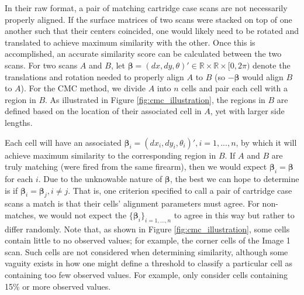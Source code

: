 In their raw format, a pair of matching cartridge case scans are not
necessarily properly aligned. If the surface matrices of two scans were
stacked on top of one another such that their centers coincided, one
would likely need to be rotated and translated to achieve maximum
similarity with the other. Once this is accomplished, an accurate
similarity score can be calculated between the two scans. For two scans
\(A\) and \(B\), let
\(\pmb{\beta} = (dx, dy, \theta)' \in \mathbb{R} \times \mathbb{R} \times [0,2\pi)\)
denote the translations and rotation needed to properly align \(A\) to
\(B\) (so \(-\pmb{\beta}\) would align \(B\) to \(A\)). For the CMC
method, we divide \(A\) into \(n\) cells and pair each cell with a
region in \(B\). As illustrated in Figure \ref{fig:cmc_illustration},
the regions in \(B\) are defined based on the location of their
associated cell in \(A\), yet with larger side lengths.

Each cell will have an associated
\(\pmb{\beta}_i = (dx_i, dy_i, \theta_i)', i = 1,...,n\), by which it
will achieve maximum similarity to the corresponding region in \(B\). If
\(A\) and \(B\) are truly matching (were fired from the same firearm),
then we would expect \(\pmb{\beta}_i = \pmb{\beta}\) for each \(i\). Due
to the unknowable nature of \(\pmb{\beta}\), the best we can hope to
determine is if \(\pmb{\beta}_i = \pmb{\beta}_j, i \neq j\). That is,
one criterion specified to call a pair of cartridge case scans a match
is that their cells' alignment parameters must agree. For non-matches,
we would not expect the \(\{\pmb{\beta}_i\}_{i = 1,...,n}\) to agree in
this way but rather to differ randomly. Note that, as shown in Figure
\ref{fig:cmc_illustration}, some cells contain little to no observed
values; for example, the corner cells of the Image 1 scan. Such cells
are not considered when determining similarity, although some vaguity
exists in how one might define a threshold to classify a particular cell
as containing too few observed values. For example,
\citet{chen_convergence_2017} only consider cells containing 15\% or
more observed values.

